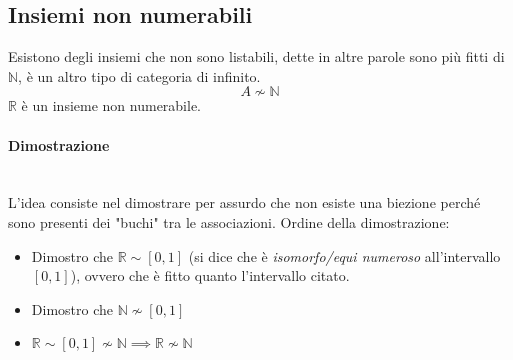 \documentclass{article}
\begin{document}
\subsection{Insiemi non numerabili}
Esistono degli insiemi che non sono listabili, dette in altre parole sono più fitti di $\mathbb{N}$,
è un altro tipo di categoria di infinito.
$$A\nsim\mathbb{N}$$
$\mathbb{R}$ è un insieme non numerabile.
\paragraph{Dimostrazione}\mbox{}\\
L'idea consiste nel dimostrare per assurdo che non esiste una biezione
perché sono presenti dei "buchi" tra le associazioni. Ordine della dimostrazione:
\begin{itemize}
    \item Dimostro che $\mathbb{R}\sim[0,1]$ (si dice che è \textit{isomorfo/equi numeroso} all'intervallo $[0,1]$),
          ovvero che è fitto quanto l'intervallo citato.
    \item Dimostro che $\mathbb{N}\nsim[0,1]$
    \item $\mathbb{R}\sim[0,1]\nsim\mathbb{N}\implies\mathbb{R}\nsim\mathbb{N}$
\end{itemize}
\end{document}
